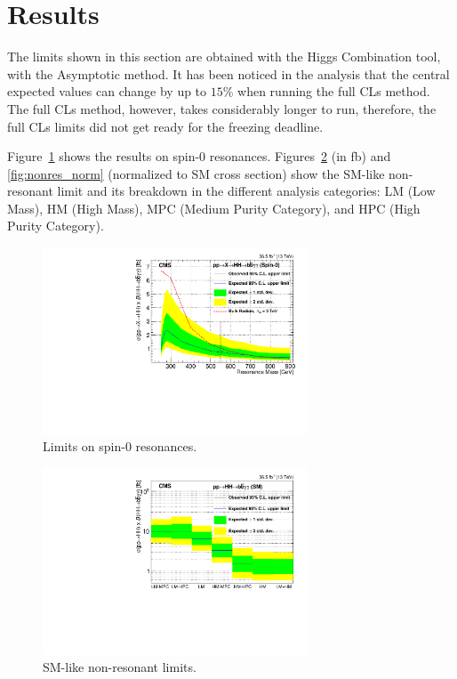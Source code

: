 \section{Results}
\label{sec:results}

The limits shown in this section are obtained with the Higgs Combination tool, with the Asymptotic method. 
It has been noticed in the analysis that the central expected values can change by up to $15\%$ when running the full CLs method. 
The full CLs method, however, takes considerably longer to run, therefore, the full CLs limits did not get ready for the freezing deadline. 

Figure~\ref{fig:result_radion} shows the results on spin-0 resonances.
Figures~\ref{fig:nonres} (in fb) and \ref{fig:nonres_norm} (normalized to SM cross section) show the
SM-like non-resonant limit and its breakdown in the different analysis
categories: LM (Low Mass), HM (High Mass), MPC (Medium Purity
Category), and HPC (High Purity Category).

\begin{figure}[h]
  \centering
  \includegraphics[width=0.7\textwidth]{figures/sec-results/LimsRadionLMHM.pdf}\hfil
  \caption{Limits on spin-0 resonances.}
  \label{fig:result_radion}
\end{figure}

\begin{figure}[h]
  \centering
  \includegraphics[width=0.7\textwidth]{figures/sec-results/NonResSMCats.pdf}\hfil
  \caption{SM-like non-resonant limits.}
  \label{fig:nonres}
\end{figure}

